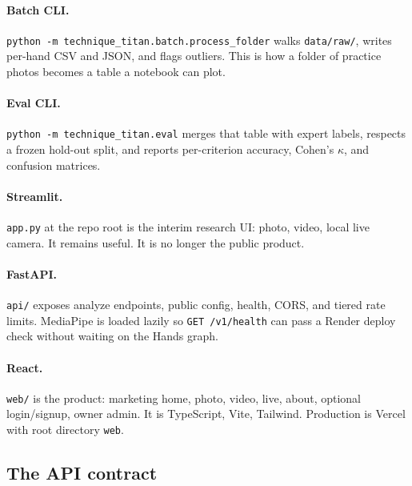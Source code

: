 \documentclass[11pt,a4paper]{article}
\newcommand{\code}[1]{\texttt{#1}}
\begin{document}
\paragraph{Batch CLI.}
\code{python -m technique\_titan.batch.process\_folder} walks \code{data/raw/}, writes per-hand CSV and JSON, and flags outliers.
This is how a folder of practice photos becomes a table a notebook can plot.

\paragraph{Eval CLI.}
\code{python -m technique\_titan.eval} merges that table with expert labels, respects a frozen hold-out split, and reports per-criterion accuracy, Cohen's \(\kappa\), and confusion matrices.

\paragraph{Streamlit.}
\code{app.py} at the repo root is the interim research UI: photo, video, local live camera.
It remains useful.
It is no longer the public product.

\paragraph{FastAPI.}
\code{api/} exposes analyze endpoints, public config, health, CORS, and tiered rate limits.
MediaPipe is loaded lazily so \code{GET /v1/health} can pass a Render deploy check without waiting on the Hands graph.

\paragraph{React.}
\code{web/} is the product: marketing home, photo, video, live, about, optional login/signup, owner admin.
It is TypeScript, Vite, Tailwind.
Production is Vercel with root directory \code{web}.

\subsection{The API contract}
\end{document}
